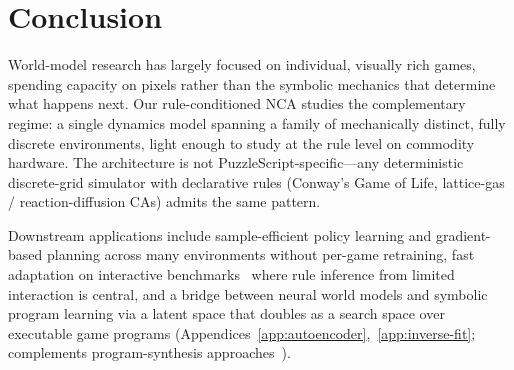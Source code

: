 \section{Conclusion}
\label{sec:conclusion}

World-model research has largely focused on individual, visually rich games, spending capacity on pixels rather than the symbolic mechanics that determine what happens next.
Our rule-conditioned NCA studies the complementary regime: a single dynamics model spanning a family of mechanically distinct, fully discrete environments, light enough to study at the rule level on commodity hardware.
The architecture is not PuzzleScript-specific---any deterministic discrete-grid simulator with declarative rules (Conway's Game of Life, lattice-gas / reaction-diffusion CAs) admits the same pattern.

Downstream applications include sample-efficient policy learning and gradient-based planning across many environments without per-game retraining, fast adaptation on interactive benchmarks~\cite{warrier2025benchmarking,arcprize2026arcagi3} where rule inference from limited interaction is central, and a bridge between neural world models and symbolic program learning via a latent space that doubles as a search space over executable game programs (Appendices~\ref{app:autoencoder},~\ref{app:inverse-fit}; complements program-synthesis approaches~\cite{tang2024worldcoder,ahmed2025theorycoder,ellis2021dreamcoder}).
